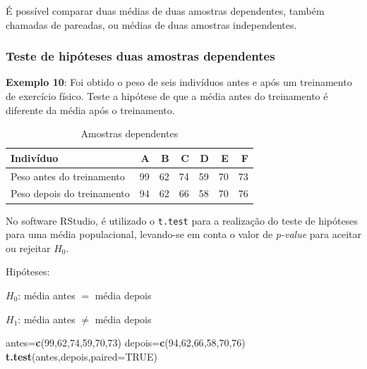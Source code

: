 \documentclass[12pt,brazil,oneside]{book}
\newenvironment{Shaded}{\begin{snugshade}}{\end{snugshade}}
\newcommand{\DataTypeTok}[1]{\textcolor[rgb]{0.13,0.29,0.53}{#1}}
\newcommand{\DecValTok}[1]{\textcolor[rgb]{0.00,0.00,0.81}{#1}}
\newcommand{\KeywordTok}[1]{\textcolor[rgb]{0.13,0.29,0.53}{\textbf{#1}}}
\newcommand{\NormalTok}[1]{#1}
\newcommand{\OtherTok}[1]{\textcolor[rgb]{0.56,0.35,0.01}{#1}}
\begin{document}
É possível comparar duas médias de duas amostras dependentes, também chamadas de pareadas, ou médias de duas amostras independentes.

\hypertarget{teste-de-hipoteses-duas-amostras-dependentes}{%
\subsubsection{Teste de hipóteses duas amostras dependentes}\label{teste-de-hipoteses-duas-amostras-dependentes}}

\textbf{Exemplo 10}: Foi obtido o peso de seis indivíduos antes e após um treinamento de exercício físico. Teste a hipótese de que a média antes do treinamento é diferente da média após o treinamento.

\begin{table}[t]

\caption{\label{tab:unnamed-chunk-147}Amostras dependentes}
\centering
\begin{tabular}{l|r|r|r|r|r|r}
\hline
Indivíduo & A & B & C & D & E & F\\
\hline
Peso antes do treinamento & 99 & 62 & 74 & 59 & 70 & 73\\
\hline
Peso depois do treinamento & 94 & 62 & 66 & 58 & 70 & 76\\
\hline
\end{tabular}
\end{table}

No software RStudio, é utilizado o \texttt{t.test} para a realização do teste de hipóteses para uma média populacional, levando-se em conta o valor de \emph{p-value} para aceitar ou rejeitar \(H_0\).

Hipóteses:

\textbf{\(H_0\)}: média antes \(=\) média depois

\textbf{\(H_1\)}: média antes \(\neq\) média depois

\begin{Shaded}
\begin{Highlighting}[]
\NormalTok{antes=}\KeywordTok{c}\NormalTok{(}\DecValTok{99}\NormalTok{,}\DecValTok{62}\NormalTok{,}\DecValTok{74}\NormalTok{,}\DecValTok{59}\NormalTok{,}\DecValTok{70}\NormalTok{,}\DecValTok{73}\NormalTok{)}
\NormalTok{depois=}\KeywordTok{c}\NormalTok{(}\DecValTok{94}\NormalTok{,}\DecValTok{62}\NormalTok{,}\DecValTok{66}\NormalTok{,}\DecValTok{58}\NormalTok{,}\DecValTok{70}\NormalTok{,}\DecValTok{76}\NormalTok{)}
\KeywordTok{t.test}\NormalTok{(antes,depois,}\DataTypeTok{paired=}\OtherTok{TRUE}\NormalTok{)}
\end{Highlighting}
\end{Shaded}
\end{document}
